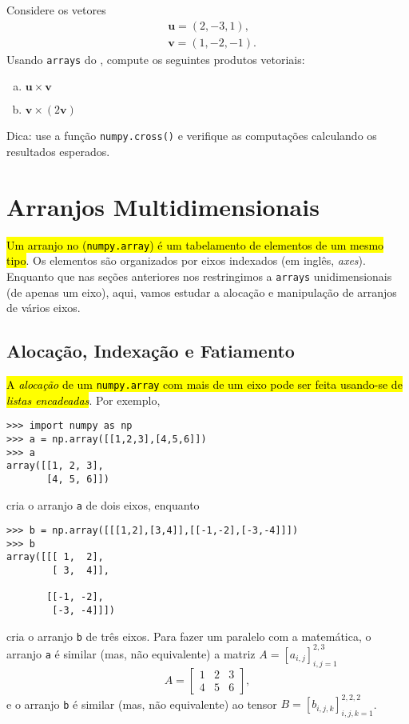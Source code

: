 \begin{exer}
  Considere os vetores
  \begin{align}
    &\pmb{u} = (2, -3, 1),\\
    &\pmb{v} = (1, -2, -1).
  \end{align}
  Usando \lstinline+arrays+ do {\numpy}, compute os seguintes produtos vetoriais:
  \begin{enumerate}[a)]
  \item $\pmb{u}\times\pmb{v}$
  \item $\pmb{v}\times (2\pmb{v})$
  \end{enumerate}
\end{exer}
\begin{resp}
  Dica: use a função \lstinline+numpy.cross()+ e verifique as computações calculando os resultados esperados.
\end{resp}

\section{Arranjos Multidimensionais}\label{cap_arr_sec_multi}

\hl{Um arranjo no {\numpy} ({\lstinline+numpy.array+}) é um tabelamento de elementos de um mesmo tipo}. Os elementos são organizados por eixos indexados (em inglês, \textit{axes}). Enquanto que nas seções anteriores nos restringimos a \lstinline+arrays+ unidimensionais (de apenas um eixo), aqui, vamos estudar a alocação e manipulação de arranjos de vários eixos.

\subsection{Alocação, Indexação e Fatiamento}

\hl{A \emph{alocação} de um {\lstinline+numpy.array+} com mais de um eixo pode ser feita usando-se de \emph{listas encadeadas}}. Por exemplo,
\begin{lstlisting}
>>> import numpy as np
>>> a = np.array([[1,2,3],[4,5,6]])
>>> a
array([[1, 2, 3],
       [4, 5, 6]])
\end{lstlisting}
cria o arranjo \lstinline+a+ de dois eixos, enquanto
\begin{lstlisting}
>>> b = np.array([[[1,2],[3,4]],[[-1,-2],[-3,-4]]])
>>> b
array([[[ 1,  2],
        [ 3,  4]],

       [[-1, -2],
        [-3, -4]]])
\end{lstlisting}
cria o arranjo \lstinline+b+ de três eixos. Para fazer um paralelo com a matemática, o arranjo \lstinline+a+ é similar (mas, não equivalente) a matriz $A = [a_{i,j}]_{i,j=1}^{2,3}$
\begin{equation}
  A =
  \begin{bmatrix}
    1 & 2 & 3\\
    4 & 5 & 6
  \end{bmatrix},
\end{equation}
e o arranjo \lstinline+b+ é similar (mas, não equivalente) ao tensor $B = [b_{i,j,k}]_{i,j,k=1}^{2,2,2}$.

